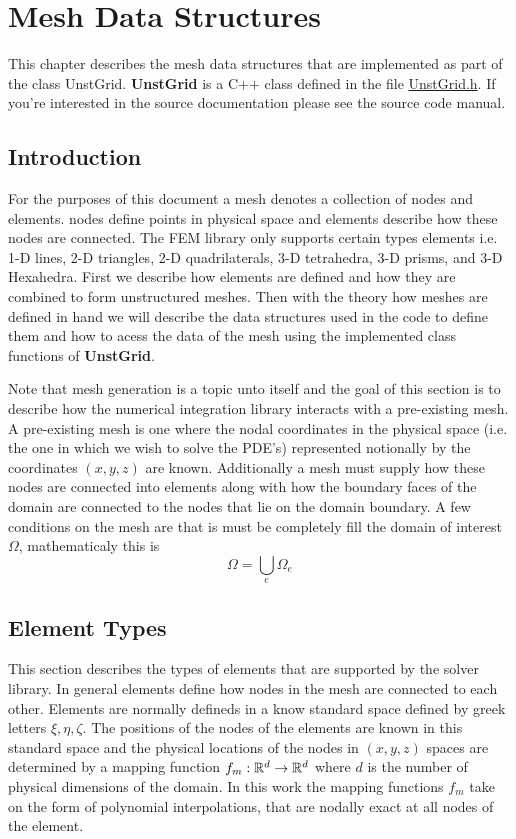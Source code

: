 \chapter{Mesh Data Structures}
This chapter describes the mesh data structures that are implemented as part of the class UnstGrid.  \textbf{UnstGrid} is a C++ class defined in the file \underline{UnstGrid.h}.  If you're interested in the source documentation please see the source code manual. 

\section{Introduction} 
For the purposes of this document a mesh denotes a collection of nodes and elements.  nodes define points in physical space and elements describe how these nodes are connected.  The FEM library only supports certain types elements i.e. 1-D lines, 2-D triangles, 2-D quadrilaterals, 3-D tetrahedra, 3-D prisms, and 3-D Hexahedra.  First we describe how elements are defined and how they are combined to form unstructured meshes.  Then with the theory how meshes are defined in hand we will describe the data structures used in the code to define them and how to acess the data of the mesh using the implemented class functions of \textbf{UnstGrid}. 

Note that mesh generation is a topic unto itself and the goal of this section is to describe how the numerical integration library interacts with a pre-existing mesh.  A pre-existing mesh is one where the nodal coordinates in the physical space (i.e. the one in which we wish to solve the PDE's) represented notionally by the coordinates $(x,y,z)$ are known.  Additionally a mesh must supply how these nodes are connected into elements along with how the boundary faces of the domain are connected to the nodes that lie on the domain boundary.  A few conditions on the mesh are that is must be completely fill the domain of interest $\Omega$, mathematicaly this is 
\begin{equation}
\Omega = \bigcup_{e} \Omega_{e}
\end{equation}  

\section{Element Types}
This section describes the types of elements that are supported by the solver library.  In general elements define how nodes in the mesh are connected to each other.  Elements are normally defineds in a know standard space defined by greek letters $\xi, \eta, \zeta$.  The positions of the nodes of the elements are known in this standard space and the physical locations of the nodes in $(x,y,z)$ spaces are determined by a mapping function $f_{m}: \mathbb{R}^{d}\rightarrow \mathbb{R}^{d} $ where $d$ is the number of physical dimensions of the domain.  In this work the mapping functions $f_{m}$ take on the form of polynomial interpolations, that are nodally exact at all nodes of the element.       
 
